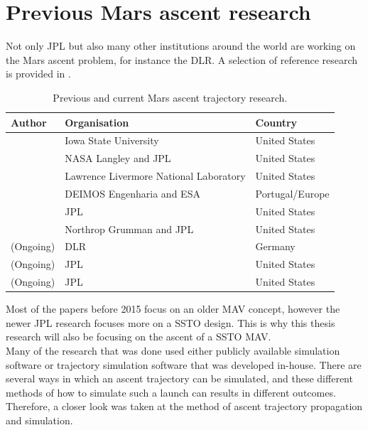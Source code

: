 
\section{Previous Mars ascent research}
\label{sec:previousMarsAscentResearch}
Not only \ac{JPL} but also many other institutions around the world are working on the Mars ascent problem, for instance the \ac{DLR}. A selection of reference research is provided in .

\begin{table}[H]
\begin{center}
\caption{Previous and current Mars ascent trajectory research.}
\label{tab:referenceResearch}
\begin{tabular}{|l|l|l|}
\hline 
\textbf{Author} 	& \textbf{Organisation} & \textbf{Country} \\ \hline \hline
\cite{fanning1996model} & Iowa State University & United States\\ \hline
\cite{desai1998}& NASA Langley and \ac{JPL} & United States \\ \hline
\cite{whitehead2004mars,whitehead2005} & Lawrence Livermore National Laboratory & United States \\ \hline
 \cite{di2007system} & DEIMOS Engenharia and \acs{ESA} & Portugal/Europe \\ \hline
\cite{woolley2011mars} & \ac{JPL} & United States \\ \hline
\cite{trinidad2012} & Northrop Grumman and \ac{JPL} & United States  \\ \hline
\cite{dumont2015design} (Ongoing)& \ac{DLR} 		& Germany \\ \hline
\cite{woolley2015simple} (Ongoing) & \ac{JPL} & United States \\ \hline
\cite{benito2016trajectory} (Ongoing) & \ac{JPL} & United States \\ \hline

\end{tabular}
\end{center}
\end{table}

Most of the papers before 2015 focus on an older \ac{MAV} concept, however the newer \ac{JPL} research focuses more on a \ac{SSTO} design. This is why this thesis research will also be focusing on the ascent of a \ac{SSTO} \ac{MAV}. \\
Many of the research that was done used either publicly available simulation software or trajectory simulation software that was developed in-house. There are several ways in which an ascent trajectory can be simulated, and these different methods of how to simulate such a launch can results in different outcomes. Therefore, a closer look was taken at the method of ascent trajectory propagation and simulation.

